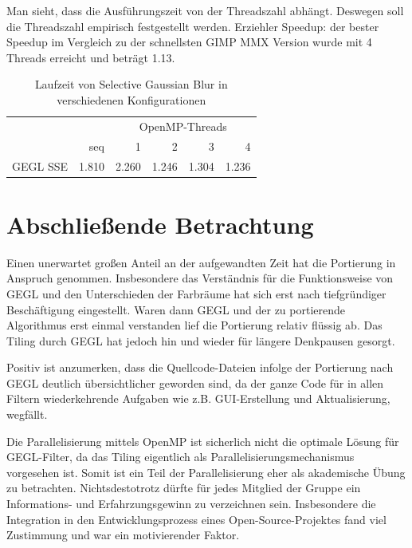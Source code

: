 \documentclass[10pt,a4paper]{article}
\begin{document}
Man sieht, dass die Ausführungszeit von der Threadszahl abhängt. Deswegen soll die Threadszahl empirisch festgestellt werden. Erziehler Speedup: der bester Speedup im Vergleich zu der schnellsten GIMP MMX Version wurde mit 4 Threads erreicht und beträgt 1.13.
\begin{table}[H]
\centering
\begin{tabular}{lrrrrr}
\toprule
 & & \multicolumn{4}{c}{OpenMP-Threads} \\
\cmidrule(r){3-6}
 & seq & 1 & 2 & 3 & 4 \\
GEGL SSE 	& 1.810 		& 2.260 		& 1.246 		& 1.304 		& 1.236 \\
\bottomrule
\end{tabular}
\caption{Laufzeit von Selective Gaussian Blur in verschiedenen Konfigurationen}
\label{tab:sgb}
\end{table}
\section{Abschließende Betrachtung}
Einen unerwartet großen Anteil an der aufgewandten Zeit hat die Portierung in Anspruch genommen. Insbesondere das Verständnis für die Funktionsweise von GEGL und den Unterschieden der Farbräume hat sich erst nach tiefgründiger Beschäftigung eingestellt. Waren dann GEGL und der zu portierende Algorithmus erst einmal verstanden lief die Portierung relativ flüssig ab. Das Tiling durch GEGL hat jedoch hin und wieder für längere Denkpausen gesorgt.

Positiv ist anzumerken, dass die Quellcode-Dateien infolge der Portierung nach GEGL deutlich übersichtlicher geworden sind, da der ganze Code für in allen Filtern wiederkehrende Aufgaben wie z.B. GUI-Erstellung und Aktualisierung, wegfällt.

Die Parallelisierung mittels OpenMP ist sicherlich nicht die optimale Lösung für GEGL-Filter, da das Tiling eigentlich als Parallelisierungsmechanismus vorgesehen ist. Somit ist ein Teil der Parallelisierung eher als akademische Übung zu betrachten. Nichtsdestotrotz dürfte für jedes Mitglied der Gruppe ein Informations- und Erfahrzungsgewinn zu verzeichnen sein. Insbesondere die Integration in den Entwicklungsprozess eines Open-Source-Projektes fand viel Zustimmung und war ein motivierender Faktor.
\end{document}
